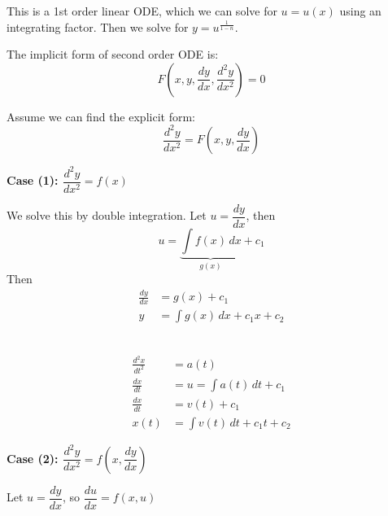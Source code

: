 \documentclass[twoside]{scrartcl}
\begin{document}
This is a 1st order linear ODE, which we can solve for $u = u(x)$ using an integrating factor. Then we solve for $y = u^{\frac{1}{1-n}}$. 
\pagebreak 


The implicit form of second order ODE is:
\[F\left(x,y,\frac{dy}{dx}, \frac{d^2y}{dx^2}\right) = 0\]

Assume we can find the explicit form: 
\[\frac{d^2y}{dx^2} = F\left(x,y,\frac{dy}{dx}\right)\]

\textbf{Case (1): $\dfrac{d^2y}{dx^2} = f(x)$}

We solve this by double integration. Let $u = \dfrac{dy}{dx}$, then 
\[u = \underbrace{\int f(x)\,dx}_{g(x)} + c_1\]
Then 
\[\begin{aligned}\frac{dy}{dx} &= g(x) + c_1\\
y &= \int g(x)\,dx + c_1x + c_2	
\end{aligned}
\]~

\begin{example}[Mechanics]
	\[
\begin{aligned}
  \frac{d^2x}{dt^2} &= a(t)\\
  \frac{dx}{dt} &= u = \int a(t)\,dt + c_1\\
  \frac{dx}{dt} &= v(t) + c_1\\
  x(t) &= \int v(t)\,dt + c_1t + c_2
\end{aligned}
\]
\end{example}\vspace*{5pt}

\textbf{Case (2): $\dfrac{d^2y}{dx^2} = f\left(x,\dfrac{dy}{dx}\right)$}

Let $u = \dfrac{dy}{dx}$, so $\dfrac{du}{dx} = f(x,u)$~\\~\\
\end{document}

